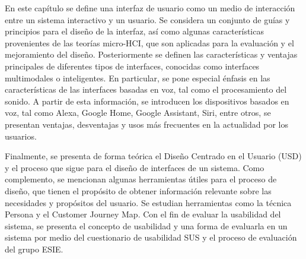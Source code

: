 En este capítulo se define una interfaz de usuario como un medio de interacción entre un sistema interactivo y un usuario. Se considera un conjunto de guías y principios para el diseño de la interfaz, así como algunas características provenientes de las teorías micro-HCI, que son aplicadas para la evaluación y el mejoramiento del diseño.
Posteriormente se definen las características y ventajas principales de diferentes tipos de interfaces, conocidas como interfaces multimodales o inteligentes. En particular, se pone especial énfasis en las características de las interfaces basadas en voz, tal como el procesamiento del sonido. A partir de esta información, se introducen los dispositivos basados en voz, tal como Alexa, Google Home, Google Assistant, Siri, entre otros, se presentan ventajas, desventajas y usos más frecuentes en la actualidad por los usuarios.

Finalmente, se presenta de forma teórica el Diseño Centrado en el Usuario (USD) y el proceso que sigue para el diseño de interfaces de un sistema. Como complemento, se mencionan algunas herramientas útiles para el proceso de diseño, que tienen el propósito de obtener información relevante sobre las necesidades y propósitos del usuario. Se estudian herramientas como la técnica Persona y el Customer Journey Map. Con el fin de evaluar la usabilidad del sistema, se presenta el concepto de usabilidad y una forma de evaluarla en un sistema por medio del cuestionario de usabilidad SUS y el proceso de evaluación del grupo ESIE.
